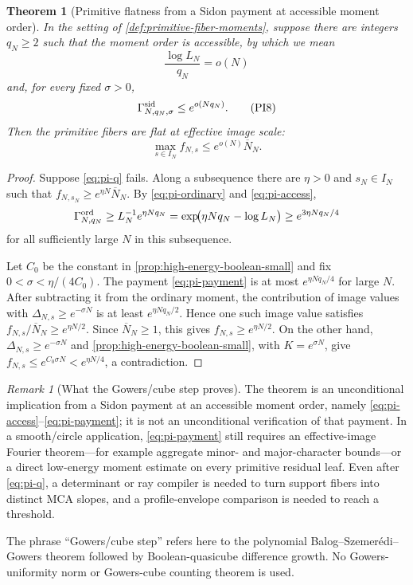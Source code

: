 \documentclass[11pt,a4paper]{amsart}
\numberwithin{equation}{section}
\newtheorem{theorem}{Theorem}[section]
\theoremstyle{remark}
\newtheorem{remark}[remark]{Remark}
\newcommand{\Gord}{\Gamma^{\rm ord}}
\newcommand{\Gsid}{\Gamma^{\rm sid}}
\newcommand{\barN}{\overline N}
\begin{document}
\begin{theorem}[Primitive flatness from a Sidon payment at accessible moment order]
\label{thm:primitive-q-after-sidon}
In the setting of \cref{def:primitive-fiber-moments}, suppose there are
integers \(q_N\ge2\) such that the moment order is \emph{accessible}, by
which we mean
\[
              \frac{\log L_N}{q_N}=o(N)             \tag{PI7}\label{eq:pi-access}
\]
and, for every fixed \(\sigma>0\),
\[
              \Gsid_{N,q_N,\sigma}\le e^{o(Nq_N)}.   \tag{PI8}\label{eq:pi-payment}
\]
Then the primitive fibers are flat at effective image scale:
\[
              \max_{s\in I_N}f_{N,s}
                 \le e^{o(N)}\barN_N.               \tag{PI9}\label{eq:pi-q}
\]
\end{theorem}

\begin{proof}
Suppose \eqref{eq:pi-q} fails.  Along a subsequence there are
\(\eta>0\) and \(s_N\in I_N\) such that
\(f_{N,s_N}\ge e^{\eta N}\barN_N\).  By
\eqref{eq:pi-ordinary} and \eqref{eq:pi-access},
\[
 \Gord_{N,q_N}
 \ge L_N^{-1}e^{\eta Nq_N}
 =\exp\!\bigl(\eta Nq_N-\log L_N\bigr)
 \ge e^{3\eta Nq_N/4}
\]
for all sufficiently large \(N\) in this subsequence.

Let \(C_0\) be the constant in
\cref{prop:high-energy-boolean-small} and fix
\(0<\sigma<\eta/(4C_0)\).  The payment
\eqref{eq:pi-payment} is at most \(e^{\eta Nq_N/4}\) for large \(N\).
After subtracting it from the ordinary moment, the contribution of image
values with \(\Delta_{N,s}\ge e^{-\sigma N}\) is at least
\(e^{\eta Nq_N/2}\).  Hence one such image value satisfies
\(f_{N,s}/\barN_N\ge e^{\eta N/2}\).  Since \(\barN_N\ge1\), this gives
\(f_{N,s}\ge e^{\eta N/2}\).  On the other hand,
\(\Delta_{N,s}\ge e^{-\sigma N}\) and
\cref{prop:high-energy-boolean-small}, with \(K=e^{\sigma N}\), give
\(f_{N,s}\le e^{C_0\sigma N}<e^{\eta N/4}\), a contradiction.
\end{proof}

\begin{remark}[What the Gowers/cube step proves]
\label{rem:gowers-cube-scope}
The theorem is an unconditional implication from a Sidon payment at an
accessible moment order, namely
\eqref{eq:pi-access}--\eqref{eq:pi-payment}; it is not an unconditional
verification of that payment.  In a
smooth/circle application, \eqref{eq:pi-payment} still requires an
effective-image Fourier theorem---for example aggregate minor- and
major-character bounds---or a direct low-energy moment estimate on every
primitive residual leaf.  Even after \eqref{eq:pi-q}, a determinant or ray
compiler is needed to turn support fibers into distinct MCA slopes, and a
profile-envelope comparison is needed to reach a threshold.

The phrase ``Gowers/cube step'' refers here to the polynomial
Balog--Szemer\'edi--Gowers theorem followed by Boolean-quasicube difference
growth.  No Gowers-uniformity norm or Gowers-cube counting theorem is used.
\end{remark}
\end{document}
